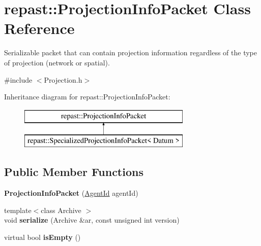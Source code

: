 \hypertarget{classrepast_1_1_projection_info_packet}{\section{repast\-:\-:Projection\-Info\-Packet Class Reference}
\label{classrepast_1_1_projection_info_packet}
}


Serializable packet that can contain projection information regardless of the type of projection (network or spatial).  




{\ttfamily \#include $<$Projection.\-h$>$}

Inheritance diagram for repast\-:\-:Projection\-Info\-Packet\-:\begin{figure}[H]
\begin{center}
\leavevmode
\includegraphics[height=2.000000cm]{classrepast_1_1_projection_info_packet}
\end{center}
\end{figure}
\subsection*{Public Member Functions}
\begin{DoxyCompactItemize}
\item 
\hypertarget{classrepast_1_1_projection_info_packet_a35712ffa6671be2c1932ed8fb58fb45d}{{\bfseries Projection\-Info\-Packet} (\hyperlink{classrepast_1_1_agent_id}{Agent\-Id} agent\-Id)}\label{classrepast_1_1_projection_info_packet_a35712ffa6671be2c1932ed8fb58fb45d}

\item 
\hypertarget{classrepast_1_1_projection_info_packet_a431829029f6f7108b89fc6dde27c4209}{{\footnotesize template$<$class Archive $>$ }\\void {\bfseries serialize} (Archive \&ar, const unsigned int version)}\label{classrepast_1_1_projection_info_packet_a431829029f6f7108b89fc6dde27c4209}

\item 
\hypertarget{classrepast_1_1_projection_info_packet_afbe080d5a5527b588465f07bfd061198}{virtual bool {\bfseries is\-Empty} ()}\label{classrepast_1_1_projection_info_packet_afbe080d5a5527b588465f07bfd061198}

\end{DoxyCompactItemize}
